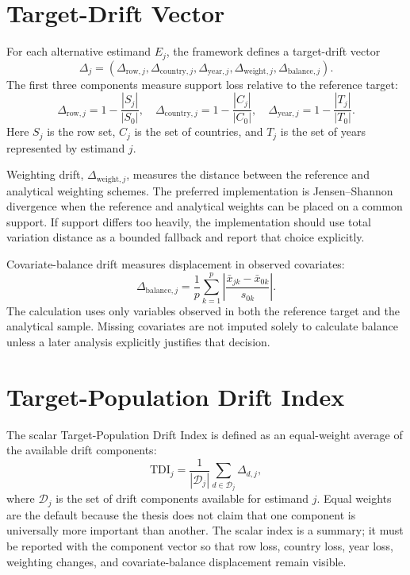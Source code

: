 \section{Target-Drift Vector}

For each alternative estimand \(E_j\), the framework defines a target-drift vector
\[
\Delta_j =
(\Delta_{\mathrm{row},j},
\Delta_{\mathrm{country},j},
\Delta_{\mathrm{year},j},
\Delta_{\mathrm{weight},j},
\Delta_{\mathrm{balance},j}).
\]
The first three components measure support loss relative to the reference target:
\[
\Delta_{\mathrm{row},j} = 1 - \frac{|S_j|}{|S_0|},
\quad
\Delta_{\mathrm{country},j} = 1 - \frac{|C_j|}{|C_0|},
\quad
\Delta_{\mathrm{year},j} = 1 - \frac{|T_j|}{|T_0|}.
\]
Here \(S_j\) is the row set, \(C_j\) is the set of countries, and \(T_j\) is the set of years represented by estimand \(j\).

Weighting drift, \(\Delta_{\mathrm{weight},j}\), measures the distance between the reference and analytical weighting schemes. The preferred implementation is Jensen--Shannon divergence when the reference and analytical weights can be placed on a common support. If support differs too heavily, the implementation should use total variation distance as a bounded fallback and report that choice explicitly.

Covariate-balance drift measures displacement in observed covariates:
\[
\Delta_{\mathrm{balance},j}
= \frac{1}{p}\sum_{k=1}^{p}
\left|
\frac{\bar{x}_{jk} - \bar{x}_{0k}}{s_{0k}}
\right|.
\]
The calculation uses only variables observed in both the reference target and the analytical sample. Missing covariates are not imputed solely to calculate balance unless a later analysis explicitly justifies that decision.

\section{Target-Population Drift Index}

The scalar Target-Population Drift Index is defined as an equal-weight average of the available drift components:
\[
\mathrm{TDI}_j =
\frac{1}{|\mathcal{D}_j|}
\sum_{d \in \mathcal{D}_j} \Delta_{d,j},
\]
where \(\mathcal{D}_j\) is the set of drift components available for estimand \(j\). Equal weights are the default because the thesis does not claim that one component is universally more important than another. The scalar index is a summary; it must be reported with the component vector so that row loss, country loss, year loss, weighting changes, and covariate-balance displacement remain visible.

